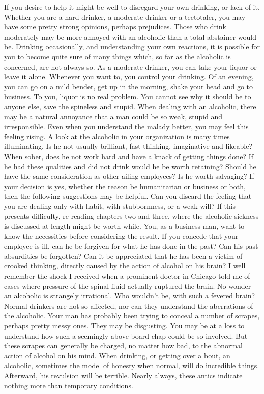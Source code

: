 \begin{biblechapter}
If you desire to help it might be well to disregard your own drinking, or lack of it.  Whether you are a hard drinker, a moderate drinker or a teetotaler, you may have some pretty strong opinions, perhaps prejudices.  Those who drink moderately may be more annoyed with an alcoholic than a total abstainer would be.  Drinking occasionally, and understanding your own reactions, it is possible for you to become quite sure of many things which, so far as the alcoholic is concerned, are not always so.  As a moderate drinker, you can take your liquor or leave it alone.  Whenever you want to, you control your drinking.  Of an evening, you can go on a mild bender, get up in the morning, shake your head and go to business.  To you, liquor is no real problem.  You cannot see why it should be to anyone else, save the spineless and stupid.
When dealing with an alcoholic, there may be a natural annoyance that a man could be so weak, stupid and irresponsible.  Even when you understand the malady better, you may feel this feeling rising.
A look at the alcoholic in your organization is many times illuminating.  Is he not usually brilliant, fast-thinking, imaginative and likeable?  When sober, does he not work hard and have a knack of getting things done?  If he had these qualities and did not drink would he be worth retaining?  Should he have the same consideration as other ailing employees?  Is he worth salvaging?  If your decision is yes, whether the reason be humanitarian or business or both, then the following suggestions may be helpful.
Can you discard the feeling that you are dealing only with habit, with stubbornness, or a weak will?  If this presents difficulty, re-reading chapters two and three, where the alcoholic sickness is discussed at length might be worth while. You, as a business man, want to know the necessities before considering the result.  If you concede that your employee is ill, can he be forgiven for what he has done in the past?  Can his past absurdities be forgotten?  Can it be appreciated that he has been a victim of crooked thinking, directly caused by the action of alcohol on his brain?
I well remember the shock I received when a prominent doctor in Chicago told me of cases where pressure of the spinal fluid actually ruptured the brain.  No wonder an alcoholic is strangely irrational.  Who wouldn't be, with such a fevered brain?  Normal drinkers are not so affected, nor can they understand the aberrations of the alcoholic.
Your man has probably been trying to conceal a number of scrapes, perhaps pretty messy ones.  They may be disgusting.  You may be at a loss to understand how such a seemingly above-board chap could be so involved.  But these scrapes can generally be charged, no matter how bad, to the abnormal action of alcohol on his mind.  When drinking, or getting over a bout, an alcoholic, sometimes the model of honesty when normal, will do incredible things.  Afterward, his revulsion will be terrible.  Nearly always, these antics indicate nothing more than temporary conditions.

\end{biblechapter}
